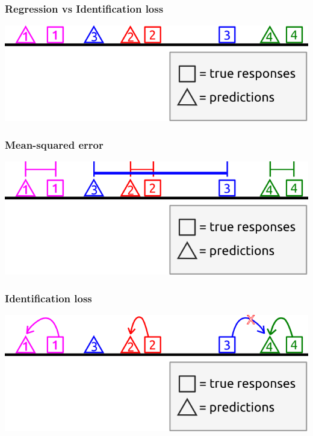 \documentclass{beamer}
\begin{document}
\begin{frame}
\frametitle{Regression vs Identification loss}
\begin{center}
\includegraphics[scale = 0.5]{../diagram/idloss1.png}
\end{center}
\end{frame}

\begin{frame}
\frametitle{Mean-squared error}
\begin{center}
\includegraphics[scale = 0.5]{../diagram/idloss2a.png}
\end{center}
\end{frame}

\begin{frame}
\frametitle{Identification loss}
\begin{center}
\includegraphics[scale = 0.5]{../diagram/idloss2b.png}
\end{center}
\end{frame}
\end{document}
